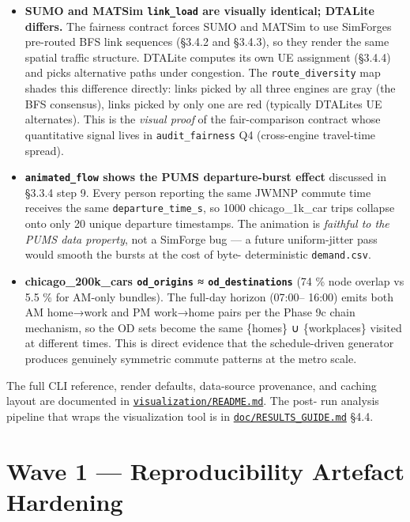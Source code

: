 \begin{itemize}
\item
  \textbf{SUMO and MATSim \texttt{link\_load} are visually identical;
  DTALite differs.} The fairness contract forces SUMO and MATSim to use
  SimForge\textquotesingle s pre-routed BFS link sequences (§3.4.2 and
  §3.4.3), so they render the same spatial traffic structure. DTALite
  computes its own UE assignment (§3.4.4) and picks alternative paths
  under congestion. The \texttt{route\_diversity} map shades this
  difference directly: links picked by all three engines are gray (the
  BFS consensus), links picked by only one are red (typically
  DTALite\textquotesingle s UE alternates). This is the \emph{visual
  proof} of the fair-comparison contract whose quantitative signal lives
  in \texttt{audit\_fairness} Q4 (cross-engine travel-time spread).
\item
  \textbf{\texttt{animated\_flow} shows the PUMS departure-burst effect}
  discussed in §3.3.4 step 9. Every person reporting the same JWMNP
  commute time receives the same \texttt{departure\_time\_s}, so 1000
  chicago\_1k\_car trips collapse onto only 20 unique departure
  timestamps. The animation is \emph{faithful to the PUMS data
  property}, not a SimForge bug --- a future uniform-jitter pass would
  smooth the bursts at the cost of byte- deterministic
  \texttt{demand.csv}.
\item
  \textbf{chicago\_200k\_car\textquotesingle s \texttt{od\_origins} ≈
  \texttt{od\_destinations}} (74 \% node overlap vs 5.5 \% for AM-only
  bundles). The full-day horizon (07:00-- 16:00) emits both AM home→work
  and PM work→home pairs per the Phase 9c chain mechanism, so the OD
  sets become the same \{homes\} ∪ \{workplaces\} visited at different
  times. This is direct evidence that the schedule-driven generator
  produces genuinely symmetric commute patterns at the metro scale.
\end{itemize}

The full CLI reference, render defaults, data-source provenance, and
caching layout are documented in
\href{../../visualization/README.md}{\texttt{visualization/README.md}}.
The post- run analysis pipeline that wraps the visualization tool is in
\href{../RESULTS_GUIDE.md}{\texttt{doc/RESULTS\_GUIDE.md}} §4.4.

\section{Wave 1 --- Reproducibility Artefact
Hardening}\label{310-wave-1--reproducibility-artefact-hardening}

